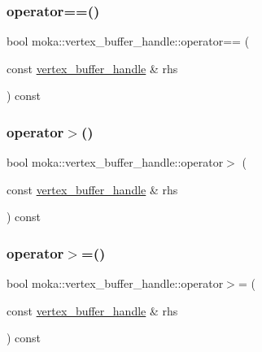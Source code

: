 \mbox{\label{structmoka_1_1vertex__buffer__handle_ad445e3612890e0c7a09ea8f3276f8ce3}} 
\subsubsection{\texorpdfstring{operator==()}{operator==()}\hspace{0.1cm}{\footnotesize\ttfamily [2/2]}}
{\footnotesize\ttfamily bool moka\+::vertex\+\_\+buffer\+\_\+handle\+::operator== (\begin{DoxyParamCaption}\item[{const \mbox{\hyperlink{structmoka_1_1vertex__buffer__handle}{vertex\+\_\+buffer\+\_\+handle}} \&}]{rhs }\end{DoxyParamCaption}) const}

\mbox{\label{structmoka_1_1vertex__buffer__handle_a7fd7827b31829ef4bf4bf695457e5c24}} 
\subsubsection{\texorpdfstring{operator$>$()}{operator>()}}
{\footnotesize\ttfamily bool moka\+::vertex\+\_\+buffer\+\_\+handle\+::operator$>$ (\begin{DoxyParamCaption}\item[{const \mbox{\hyperlink{structmoka_1_1vertex__buffer__handle}{vertex\+\_\+buffer\+\_\+handle}} \&}]{rhs }\end{DoxyParamCaption}) const}

\mbox{\label{structmoka_1_1vertex__buffer__handle_ab3b1d0b7656cc1e6e7d68a383d5ceae8}} 
\subsubsection{\texorpdfstring{operator$>$=()}{operator>=()}}
{\footnotesize\ttfamily bool moka\+::vertex\+\_\+buffer\+\_\+handle\+::operator$>$= (\begin{DoxyParamCaption}\item[{const \mbox{\hyperlink{structmoka_1_1vertex__buffer__handle}{vertex\+\_\+buffer\+\_\+handle}} \&}]{rhs }\end{DoxyParamCaption}) const}



